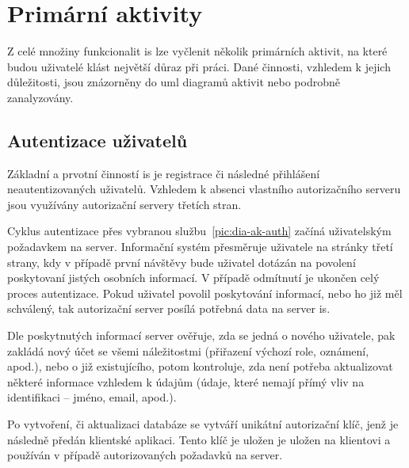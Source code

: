\section{Primární aktivity}

Z celé množiny funkcionalit \gls{is} lze vyčlenit několik primárních aktivit, na které budou uživatelé klást největší důraz při práci. Dané činnosti, vzhledem k jejich důležitosti, jsou znázorněny do \gls{uml} diagramů aktivit nebo podrobně zanalyzovány.




\subsection{Autentizace uživatelů}

Základní a prvotní činností \gls{is} je registrace či následné přihlášení neautentizovaných uživatelů. Vzhledem k absenci vlastního autorizačního serveru jsou využívány autorizační servery třetích stran.

Cyklus autentizace přes vybranou službu~\ref{pic:dia-ak-auth} začíná uživatelským požadavkem na server. Informační systém přesměruje uživatele na stránky třetí strany, kdy v případě první návštěvy bude uživatel dotázán na povolení poskytovaní jistých osobních informací. V případě odmítnutí je ukončen celý proces autentizace. Pokud uživatel povolil poskytování informací, nebo ho již měl schválený, tak autorizační server posílá potřebná data na server \gls{is}.

Dle poskytnutých informací server ověřuje, zda se jedná o nového uživatele, pak zakládá nový účet se všemi náležitostmi (přiřazení výchozí role, oznámení, apod.), nebo o již existujícího, potom kontroluje, zda není potřeba aktualizovat některé informace vzhledem k údajům (údaje, které nemají přímý vliv na identifikaci -- jméno, email, apod.).

Po vytvoření, či aktualizaci databáze se vytváří unikátní autorizační klíč, jenž je následně předán klientské aplikaci. Tento klíč je uložen je uložen na klientovi a používán v případě autorizovaných požadavků na server.


